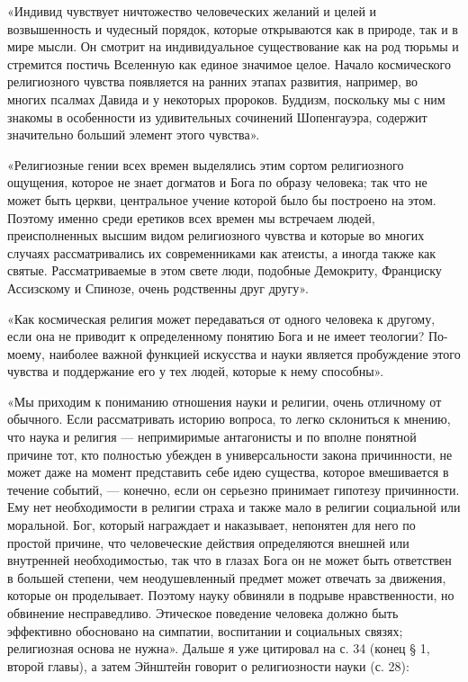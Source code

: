 «Индивид  чувствует   ничтожество  человеческих  желаний  и   целей  и
возвышенность и  чудесный порядок, которые открываются  как в природе,
так и в мире мысли. Он  смотрит на индивидуальное существование как на
род тюрьмы  и стремится постичь  Вселенную как единое  значимое целое.
Начало космического  религиозного чувства появляется на  ранних этапах
развития, например, во  многих псалмах Давида и  у некоторых пророков.
Буддизм,  поскольку мы  с ним  знакомы в  особенности из  удивительных
сочинений  Шопенгауэра,  содержит  значительно больший  элемент  этого
чувства».

«Религиозные  гении всех  времен выделялись  этим сортом  религиозного
ощущения, которое не знает догматов и Бога по образу человека; так что
не может быть церкви, центральное  учение которой было бы построено на
этом. Поэтому  именно среди еретиков  всех времен мы  встречаем людей,
преисполненных высшим  видом религиозного чувства и  которые во многих
случаях рассматривались их современниками  как атеисты, а иногда также
как  святые. Рассматриваемые  в этом  свете люди,  подобные Демокриту,
Франциску Ассизскому и Спинозе, очень родственны друг другу».

«Как  космическая  религия может  передаваться  от  одного человека  к
другому,  если она  не  приводит  к определенному  понятию  Бога и  не
имеет теологии?  По-моему, наиболее важной функцией  искусства и науки
является  пробуждение этого  чувства и  поддержание его  у тех  людей,
которые к нему способны».

«Мы приходим к пониманию отношения науки и религии, очень отличному от
обычного. Если  рассматривать историю  вопроса, то легко  склониться к
мнению,  что  наука  и  религия  ---  непримиримые  антагонисты  и  по
вполне понятной  причине тот, кто полностью  убежден в универсальности
закона  причинности, не  может даже  на момент  представить себе  идею
существа, которое вмешивается в течение  событий, --- конечно, если он
серьезно  принимает  гипотезу  причинности. Ему  нет  необходимости  в
религии страха и  также мало в религии социальной  или моральной. Бог,
который  награждает  и  наказывает,  непонятен  для  него  по  простой
причине, что человеческие действия определяются внешней или внутренней
необходимостью,  так что  в глазах  Бога он  не может  быть ответствен
в  большей  степени,  чем  неодушевленный предмет  может  отвечать  за
движения,  которые он  проделывает. Поэтому  науку обвиняли  в подрыве
нравственности,  но   обвинение  несправедливо.   Этическое  поведение
человека  должно быть  эффективно обосновано  на симпатии,  воспитании
и  социальных  связях; религиозная  основа  не  нужна». Дальше  я  уже
цитировал на с. 34 (конец § 1, второй главы), а затем Эйнштейн говорит
о религиозности науки (с. 28):

